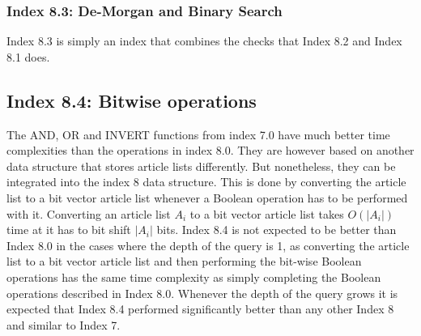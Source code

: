 \subsubsection{Index 8.3: De-Morgan and Binary Search}
Index 8.3 is simply an index that combines the checks that Index 8.2 and Index 8.1 does.

\subsection{Index 8.4: Bitwise operations}
The AND, OR and INVERT functions from index 7.0 have much better time complexities than the operations in index 8.0. They are however based on another data structure that stores article lists differently. But nonetheless, they can be integrated into the index 8 data structure. This is done by converting the article list to a bit vector article list whenever a Boolean operation has to be performed with it. Converting an article list $A_i$ to a bit vector article list takes $O(|A_i|)$ time at it has to bit shift $|A_i|$ bits. Index 8.4 is not expected to be better than Index 8.0 in the cases where the depth of the query is 1, as converting the article list to a bit vector article list and then performing the bit-wise Boolean operations has the same time complexity as simply completing the Boolean operations described in Index 8.0. Whenever the depth of the query grows it is expected that Index 8.4 performed significantly better than any other Index 8 and similar to Index 7.

